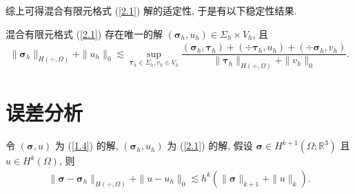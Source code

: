 	综上可得混合有限元格式 (\ref{2.1}) 解的适定性, 于是有以下稳定性结果.
	\begin{theorem}
		混合有限元格式 (\ref{2.1}) 存在唯一的解 $(\boldsymbol\sigma_h, u_h)\in \Sigma_h\times V_h$, 且
		\begin{align}
			\label{2.6}
			\|\boldsymbol\sigma_h\|_{H(\div,\Omega)}+\|u_h\|_0\lesssim\sup_{\boldsymbol\tau_h\in \Sigma_h, v_h\in V_h}\dfrac{(\boldsymbol\sigma_h, \boldsymbol\tau_h)+(\div\boldsymbol\tau_h, u_h)+(\div\boldsymbol\sigma_h, v_h)}{\|\boldsymbol\tau_h\|_{H(\div,\Omega)}+\|v_h\|_0}.
		\end{align}
	\end{theorem}
	
		
	\section{误差分析}
	\begin{theorem}\label{th3.1}
		令 $(\boldsymbol\sigma, u)$ 为 (\ref{1.4}) 的解, $(\boldsymbol\sigma_h, u_h)$ 为 (\ref{2.1}) 的解, 假设 $\boldsymbol\sigma\in H^{k+1}(\Omega;\mathbb{R}^3)$ 且 $u\in H^{k}(\Omega)$, 则
		\begin{align}
			\label{3.1}
			\|\boldsymbol\sigma-\boldsymbol\sigma_h\|_{H(\div,\Omega)}+\|u-u_h\|_0\lesssim h^k(\|\boldsymbol\sigma\|_{k+1}+\|u\|_k).
		\end{align}
	\end{theorem}
